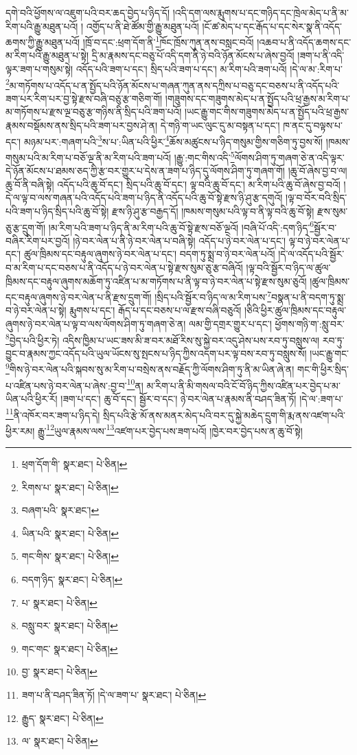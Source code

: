 དགེ་བའི་ཕྱོགས་ལ་འཇུག་པའི་བར་ཆད་བྱེད་པ་ཉིད་དོ། །འདི་དག་ལས་རྨུགས་པ་དང་གཉིད་དང་ཁྲེལ་མེད་པ་ནི་མ་རིག་པའི་རྒྱུ་མཐུན་པའོ། །
འགྱོད་པ་ནི་ཐེ་ཚོམ་གྱི་རྒྱུ་མཐུན་པའོ། །ངོ་ཚ་མེད་པ་དང་རྒོད་པ་དང་སེར་སྣ་ནི་འདོད་ཆགས་ཀྱི་རྒྱུ་མཐུན་པའོ། །ཁྲོ་བ་དང་:ཕྲག་དོག་ནི་\footnote{ཕྲག་དོག་གི་  སྣར་ཐང་།  པེ་ཅིན། }ཁོང་ཁྲོས་ཀུན་ནས་བསླང་བའོ། །འཆབ་པ་ནི་འདོད་ཆགས་དང་མ་རིག་པའི་རྒྱུ་མཐུན་པ་སྟེ། དྲི་མ་རྣམས་དང་བཅུ་པོ་འདི་དག་ནི་ཉེ་བའི་ཉོན་མོངས་པ་ཞེས་བྱའོ། །ཟག་པ་ནི་འདི་ལྟར་ཟག་པ་གསུམ་སྟེ། འདོད་པའི་ཟག་པ་དང་། སྲིད་པའི་ཟག་པ་དང་། མ་རིག་པའི་ཟག་པའོ། །དེ་ལ་མ་:རིག་པ་\footnote{རིགས་པ་  སྣར་ཐང་།  པེ་ཅིན། }མ་གཏོགས་པ་འདོད་པ་ན་སྤྱོད་པའི་ཉོན་མོངས་པ་གཞན་ཀུན་ནས་དཀྲིས་པ་བཅུ་དང་བཅས་པ་ནི་འདོད་པའི་ཟག་པར་རིག་པར་བྱ་སྟེ་རྫས་བཞི་བཅུ་རྩ་གཅིག་གོ། །གཟུགས་དང་གཟུགས་མེད་པ་ན་སྤྱོད་པའི་ཕྲ་རྒྱས་མ་རིག་པ་མ་གཏོགས་པ་རྫས་ལྔ་བཅུ་རྩ་གཉིས་ནི་སྲིད་པའི་ཟག་པའོ། །ཡང་རྒྱུ་གང་གིས་གཟུགས་མེད་པ་ན་སྤྱོད་པའི་ཕྲ་རྒྱས་རྣམས་བསྡོམས་ནས་སྲིད་པའི་ཟག་པར་བྱས་ཤེ་ན། དེ་གཉི་ག་ཡང་ལུང་དུ་མ་བསྟན་པ་དང་། ཁ་ནང་དུ་བལྟས་པ་དང་། མཉམ་པར་:གཞག་པའི་\footnote{བཞག་པའི་  སྣར་ཐང་། }ས་པ་:ཡིན་པའི་ཕྱིར་\footnote{ཡིན་པའི་  སྣར་ཐང་།  པེ་ཅིན། }ཆོས་མཚུངས་པ་ཉིད་གསུམ་གྱིས་གཅིག་ཏུ་བྱས་སོ། །ཁམས་གསུམ་པའི་མ་རིག་པ་བཅོ་ལྔ་ནི་མ་རིག་པའི་ཟག་པའོ། །རྒྱུ་:གང་གིས་འདི་\footnote{གང་གིས་  སྣར་ཐང་།  པེ་ཅིན། }ལོགས་ཤིག་ཏུ་གཞག་ཅེ་ན་འདི་ལྟར་དེ་ཉོན་མོངས་པ་ཐམས་ཅད་ཀྱི་རྩ་བར་གྱུར་པ་དེས་ན་ཟག་པ་ཉིད་དུ་ལོགས་ཤིག་ཏུ་གཞག་གོ། །ཆུ་བོ་ཞེས་བྱ་བ་ལ། ཆུ་བོ་ནི་བཞི་སྟེ། འདོད་པའི་ཆུ་བོ་དང་། སྲིད་པའི་ཆུ་བོ་དང་། ལྟ་བའི་ཆུ་བོ་དང་། མ་རིག་པའི་ཆུ་བོ་ཞེས་བྱ་བའོ། །དེ་ལ་ལྟ་བ་ལས་གཞན་པའི་འདོད་པའི་ཟག་པ་ཉིད་ནི་འདོད་པའི་ཆུ་བོ་སྟེ་རྫས་ཉི་ཤུ་རྩ་དགུའོ། །ལྟ་བ་བོར་བའི་སྲིད་པའི་ཟག་པ་ཉིད་སྲིད་པའི་ཆུ་བོ་སྟེ། རྫས་ཉི་ཤུ་རྩ་བརྒྱད་དོ། །ཁམས་གསུམ་པའི་ལྟ་བ་ནི་ལྟ་བའི་ཆུ་བོ་སྟེ། རྫས་སུམ་ཅུ་རྩ་དྲུག་གོ། །མ་རིག་པའི་ཟག་པ་ཉིད་ནི་མ་རིག་པའི་ཆུ་བོ་སྟེ་རྫས་བཅོ་ལྔའོ། །བཞི་པོ་འདི་:དག་ཉིད་\footnote{བདག་ཉིད་  སྣར་ཐང་།  པེ་ཅིན། }སྦྱོར་བ་བཞིར་རིག་པར་བྱའོ། །ཉེ་བར་ལེན་པ་ནི་ཉེ་བར་ལེན་པ་བཞི་སྟེ། འདོད་པ་ཉེ་བར་ལེན་པ་དང་། ལྟ་བ་ཉེ་བར་ལེན་པ་དང་། ཚུལ་ཁྲིམས་དང་བརྟུལ་ཞུགས་ཉེ་བར་ལེན་པ་དང་། བདག་ཏུ་སྨྲ་བ་ཉེ་བར་ལེན་པའོ། །དེ་ལ་འདོད་པའི་སྦྱོར་བ་མ་རིག་པ་དང་བཅས་པ་ནི་འདོད་པ་ཉེ་བར་ལེན་པ་སྟེ་རྫས་སུམ་ཅུ་རྩ་བཞིའོ། །ལྟ་བའི་སྦྱོར་བ་ཉིད་ལ་ཚུལ་ཁྲིམས་དང་བརྟུལ་ཞུགས་མཆོག་ཏུ་འཛིན་པ་མ་གཏོགས་པ་ནི་ལྟ་བ་ཉེ་བར་ལེན་པ་སྟེ་རྫས་སུམ་ཅུའོ། །ཚུལ་ཁྲིམས་དང་བརྟུལ་ཞུགས་ཉེ་བར་ལེན་པ་ནི་རྫས་དྲུག་གོ། །སྲིད་པའི་སྦྱོར་བ་ཉིད་ལ་མ་རིག་པས་\footnote{པ་  སྣར་ཐང་།  པེ་ཅིན། }བསྣན་པ་ནི་བདག་ཏུ་སྨྲ་བ་ཉེ་བར་ལེན་པ་སྟེ། རྨུགས་པ་དང་། རྒོད་པ་དང་བཅས་པ་ལ་རྫས་བཞི་བཅུའོ། །ཅིའི་ཕྱིར་ཚུལ་ཁྲིམས་དང་བརྟུལ་ཞུགས་ཉེ་བར་ལེན་པ་ལྟ་བ་ལས་ལོགས་ཤིག་ཏུ་གཞག་ཅེ་ན། ལམ་གྱི་དགྲར་གྱུར་པ་དང་། ཕྱོགས་གཉི་ག་:སླུ་བར་\footnote{བསླུ་བར་  སྣར་ཐང་།  པེ་ཅིན། }བྱེད་པའི་ཕྱིར་ཏེ། འདིས་ཁྱིམ་པ་ཡང་ཟས་མི་ཟ་བར་མཐོ་རིས་སུ་སྐྱེ་བར་འདུ་ཤེས་པས་རབ་ཏུ་བསླུས་ལ། རབ་ཏུ་བྱུང་བ་རྣམས་ཀྱང་འདོད་པའི་ཡུལ་ཡོངས་སུ་སྤངས་པ་ཉིད་ཀྱིས་འདག་པར་ལྟ་བས་རབ་ཏུ་བསླུས་སོ། །ཡང་རྒྱུ་གང་\footnote{གང་གང་  སྣར་ཐང་།  པེ་ཅིན། }གིས་ཉེ་བར་ལེན་པའི་སྐབས་སུ་མ་རིག་པ་བསྲེས་ནས་བརྗོད་ཀྱི་ལོགས་ཤིག་ཏུ་ནི་མ་ཡིན་ཞེ་ན། གང་གི་ཕྱིར་སྲིད་པ་འཛིན་པས་ཉེ་བར་ལེན་པ་ཞེས་:བྱ་བ་\footnote{བྱ་  སྣར་ཐང་།  པེ་ཅིན། }ན། མ་རིག་པ་ནི་མི་གསལ་བའི་ངོ་བོ་ཉིད་ཀྱིས་འཛིན་པར་བྱེད་པ་མ་ཡིན་པའི་ཕྱིར་རོ། །ཟག་པ་དང་། ཆུ་བོ་དང་། སྦྱོར་བ་དང་། ཉེ་བར་ལེན་པ་རྣམས་ནི་བཤད་ཟིན་ཏོ། །དེ་ལ་:ཟག་པ་\footnote{ཟག་པ་ནི་བཤད་ཟིན་ཏོ། །དེ་ལ་ཟག་པ་  སྣར་ཐང་།  པེ་ཅིན། }ནི་འཁོར་བར་ཟག་པ་ཉིད་དེ། སྲིད་པའི་རྩེ་མོ་ནས་མནར་མེད་པའི་བར་དུ་སྐྱེ་མཆེད་དྲུག་གི་རྨ་ནས་འཛག་པའི་ཕྱིར་རམ། རྒྱུ་\footnote{རྒྱུད་  སྣར་ཐང་།  པེ་ཅིན། }ཡུལ་རྣམས་ལས་\footnote{ལ་  སྣར་ཐང་།  པེ་ཅིན། }འཛག་པར་བྱེད་པས་ཟག་པའོ། །ཁྱེར་བར་བྱེད་པས་ན་ཆུ་བོ་སྟེ། 